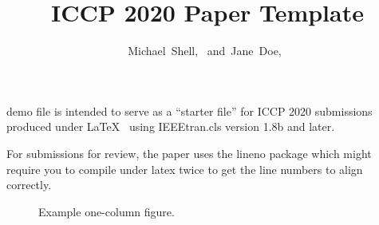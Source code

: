 \documentclass[10pt,journal,compsoc]{IEEEtran}
\title{ICCP 2020 Paper Template}
\author{Michael~Shell,~\IEEEmembership{Member,~IEEE,}
        and~Jane~Doe,~\IEEEmembership{Life~Fellow,~IEEE}%
\IEEEcompsocitemizethanks{\IEEEcompsocthanksitem M. Shell is with the Department
of Electrical and Computer Engineering, Georgia Institute of Technology, Atlanta,
GA, 30332.\protect\\
E-mail: see http://www.michaelshell.org/contact.html
\IEEEcompsocthanksitem J. Doe is with Anonymous University.}%
}
\newif\ifpeerreview
\newcommand{\paperID}{XXXX}
\begin{document}


\ifpeerreview
\linenumbers \linenumbersep 15pt\relax 
\author{Paper ID \paperID\IEEEcompsocitemizethanks{\IEEEcompsocthanksitem This paper is under review for ICCP 2020 and the PAMI special issue on computational photography. Do not distribute.}}
\markboth{Anonymous ICCP 2020 submission ID \paperID}%
{}
\fi
\maketitle



% 
% 
% 
% 
 demo file is intended to serve as a ``starter
file'' for ICCP 2020 submissions produced under
\LaTeX~\cite{kopka-latex} using IEEEtran.cls version 1.8b and later.

For submissions for review, the paper uses the lineno package which
might require you to compile under latex twice to get the line numbers
to align correctly.

\lipsum[2-4]


\begin{figure}[!t]
\centering
{}
\caption{Example one-column figure.}
\end{figure}
\end{document}
